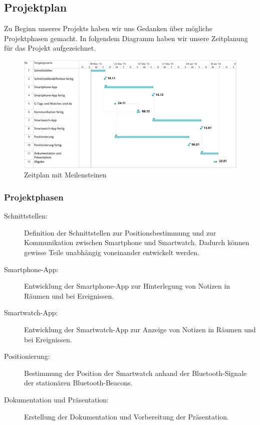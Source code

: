 \subsection{Projektplan}
Zu Beginn unseres Projekts haben wir uns Gedanken über mögliche Projektphasen gemacht. In folgendem Diagramm haben wir unsere Zeitplanung für das Projekt aufgezeichnet.

\begin{figure}[tbh]
\centering
\includegraphics[width=1.0\linewidth]{Bilder/Projektplan}
\caption{Zeitplan mit Meilensteinen}
\label{fig:Zeitplan-1}
\end{figure}

\subsubsection{Projektphasen}
\begin{description}
	\item[Schnittstellen:] Definition der Schnittstellen zur Positionsbestimmung und zur Kommunikation zwischen
	Smartphone und Smartwatch. Dadurch können gewisse Teile unabhängig voneinander entwickelt werden.
	\item[Smartphone-App:] Entwicklung der Smartphone-App zur Hinterlegung von Notizen in Räumen und bei Ereignissen.
	\item[Smartwatch-App:] Entwicklung der Smartwatch-App zur Anzeige von Notizen in Räumen und bei Ereignissen.
	\item[Positionierung:] Bestimmung der Position der Smartwatch anhand der Bluetooth-Signale der stationären Bluetooth-Beacons.
	\item[Dokumentation und Präsentation:] Erstellung der Dokumentation und Vorbereitung der Präsentation.
\end{description}

